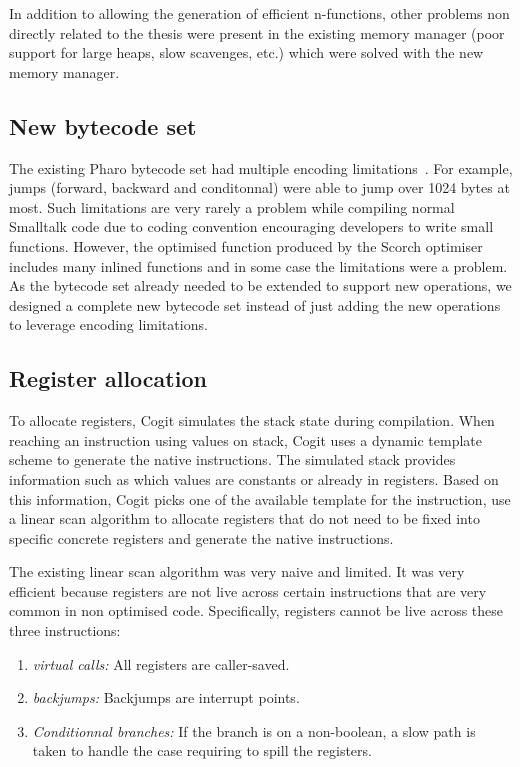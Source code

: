 \documentclass[a4paper,12pt,twoside]{../includes/ThesisStyle}
\begin{document}
In addition to allowing the generation of efficient n-functions, other problems non directly related to the thesis were present in the existing memory manager (poor support for large heaps, slow scavenges, etc.) which were solved with the new memory manager.


\subsection{New bytecode set}

The existing Pharo bytecode set had multiple encoding limitations~\cite{Bera14a}. For example, jumps (forward, backward and conditonnal) were able to jump over 1024 bytes at most. Such limitations are very rarely a problem while compiling normal Smalltalk code due to coding convention encouraging developers to write small functions. However, the optimised function produced by the Scorch optimiser includes many inlined functions and in some case the limitations were a problem. As the bytecode set already needed to be extended to support new operations, we designed a complete new bytecode set instead of just adding the new operations to leverage encoding limitations.

\subsection{Register allocation}

To allocate registers, Cogit simulates the stack state during compilation. When reaching an instruction using values on stack, Cogit uses a dynamic template scheme to generate the native instructions. The simulated stack provides information such as which values are constants or already in registers. Based on this information, Cogit picks one of the available template for the instruction, use a linear scan algorithm to allocate registers that do not need to be fixed into specific concrete registers and generate the native instructions.

The existing linear scan algorithm was very naive and limited. It was very efficient because registers are not live across certain instructions that are very common in non optimised code. Specifically, registers cannot be live across these three instructions:
\begin{enumerate}
	\item \emph{virtual calls:} All registers are caller-saved.
	\item \emph{backjumps:} Backjumps are interrupt points.
	\item \emph{Conditionnal branches:} If the branch is on a non-boolean, a slow path is taken to handle the case requiring to spill the registers.
\end{enumerate}
\end{document}
